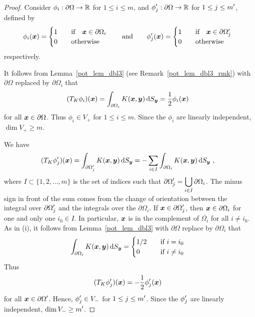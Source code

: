 \begin{proof}
Consider $\phi_i : \partial \Omega \rightarrow \mathbb{R}$ for $1\leq i \leq m$, and
$\displaystyle \phi_j^{\prime} : \partial \Omega \rightarrow \mathbb{R}$ for
$\displaystyle 1\leq j \leq m^{\prime}$, defined by
\begin{equation} \label{pot_phiI_phiJc}
\phi_i({\bm{x}}) =
\begin{cases}
1 & \quad \text{if} \quad {\bm{x}} \in \partial \Omega_i \\
0 & \quad \text{otherwise}
\end{cases}
\qquad \text{and} \qquad
\phi_j^{\prime}({\bm{x}}) =
\begin{cases}
1 & \quad \text{if} \quad {\bm{x}} \in \partial \Omega_j^{\prime} \\
0 & \quad \text{otherwise}
\end{cases}
\end{equation}
respectively.

 It follows from Lemma~\ref{pot_lem_dbl3} (see
Remark~\ref{pot_lem_dbl3_rmk}) with
$\partial \Omega$ replaced by $\partial \Omega_i$ that
\[
(T_K \phi_i)({\bm{x}}) = \int_{\partial \Omega_i} K({\bm{x}},{\bm{y}})
\,\mathrm{d}{S}_{{\bm{y}}} = \frac{1}{2} \phi_i({\bm{x}})
\]
for all ${\bm{x}} \in \partial \Omega$.
Thus $\phi_i \in V_+$ for $1 \leq i \leq m$.  Since the $\phi_i$
are linearly independent, $\dim V_+ \geq m$.

 We have
\[
(T_K \phi_j^{\prime})({\bm{x}})
= \int_{\partial \Omega_j^{\prime}} K({\bm{x}},{\bm{y}}) \,\mathrm{d}{S}_{{\bm{y}}}
= - \sum_{i\in I} \int_{\partial \Omega_i} K({\bm{x}},{\bm{y}}) \,\mathrm{d}{S}_{{\bm{y}}} \ ,
\]
where $I\subset \{1,2,\ldots, m\}$ is the set of indices such that
$\displaystyle \partial \Omega_j^{\prime} = \bigcup_{i\in I} \partial \Omega_i$.
The minus sign in front of the sum comes from the change of orientation
between the integral over $\displaystyle \partial \Omega_j^{\prime}$
and the integrals over the $\partial \Omega_i$.
If $\displaystyle {\bm{x}} \in \partial \Omega_j^{\prime}$, then
${\bm{x}} \in \partial \Omega_i$ for one and only one $i_0 \in I$.  In
particular, ${\bm{x}}$ is in the complement of $\overline{\Omega_i}$
for all $i \neq i_0$.  As in (i), it follows from
Lemma~\ref{pot_lem_dbl3} with
$\partial \Omega$ replace by $\partial \Omega_{i}$ that
\[
\int_{\partial \Omega_i} K({\bm{x}},{\bm{y}}) \,\mathrm{d}{S}_{{\bm{y}}} =
\begin{cases}
1/2 & \quad \text{if} \ i = i_0 \\
0 & \quad \text{if} \ i \neq i_0
\end{cases}
\]
Thus
\[
  (T_K \phi_j^{\prime})({\bm{x}}) = - \frac{1}{2} \phi_j^{\prime}({\bm{x}})
\]
for all $\displaystyle {\bm{x}} \in \partial \Omega^{\prime}$.
Hence, $\displaystyle \phi_j^{\prime} \in V_-$ for
$\displaystyle 1 \leq j \leq m^{\prime}$.
Since the $\displaystyle \phi_j^{\prime}$ are linearly independent,
$\displaystyle \dim V_- \geq m^{\prime}$.


\end{proof}
